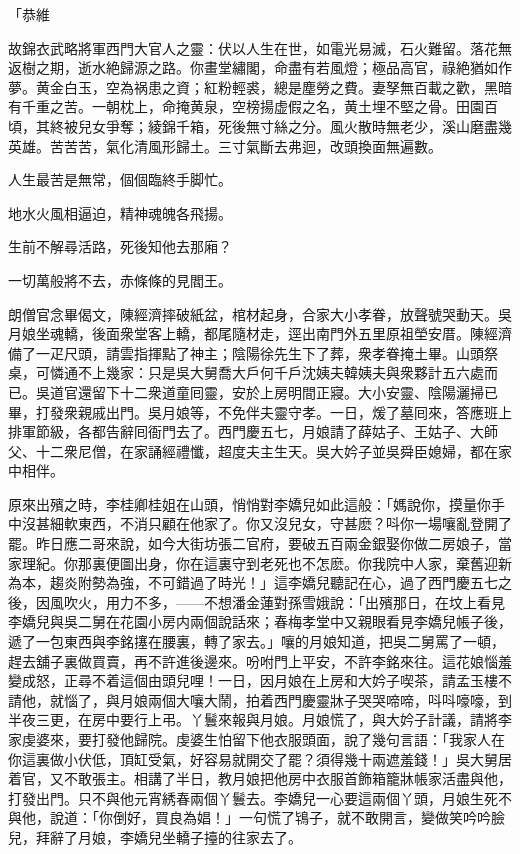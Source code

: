 \begin{myquote}
「恭維

故錦衣武略將軍西門大官人之靈：伏以人生在世，如電光易滅，石火難留。落花無返樹之期，逝水絶歸源之路。你畫堂繡閣，命盡有若風燈；極品高官，祿絶猶如作夢。黄金白玉，空為祸患之資；紅粉輕裘，總是塵勞之費。妻孥無百載之歡，黑暗有千重之苦。一朝枕上，命掩黄泉，空榜揚虚假之名，黄土埋不堅之骨。田園百頃，其終被兒女爭奪；綾錦千箱，死後無寸絲之分。風火散時無老少，溪山磨盡幾英雄。苦苦苦，氣化清風形歸土。三寸氣斷去弗迴，改頭換面無遍數。

{}

人生最苦是無常，個個臨終手脚忙。

地水火風相逼迫，精神魂魄各飛揚。

生前不解尋活路，死後知他去那廂？

一切萬般將不去，赤條條的見閻王。
\end{myquote}

朗僧官念畢偈文，陳經濟摔破紙盆，棺材起身，合家大小孝眷，放聲號哭動天。吳月娘坐魂轎，後面衆堂客上轎，都尾隨材走，逕出南門外五里原祖塋安厝。陳經濟備了一疋尺頭，請雲指揮點了神主；陰陽徐先生下了葬，衆孝眷掩土畢。山頭祭桌，可憐通不上幾家：只是吳大舅喬大戶何千戶沈姨夫韓姨夫與衆夥計五六處而已。吳道官還留下十二衆道童囘靈，安於上房明間正寢。大小安靈、陰陽灑掃已畢，打發衆親戚出門。吳月娘等，不免伴夫靈守孝。一日，煖了墓囘來，答應班上排軍節級，各都告辭囘衙門去了。西門慶五七，月娘請了薛姑子、王姑子、大師父、十二衆尼僧，在家誦經禮懺，超度夫主生天。吳大妗子並吳舜臣媳婦，都在家中相伴。

原來出殯之時，李桂卿桂姐在山頭，悄悄對李嬌兒如此這般：「媽說你，摸量你手中沒甚細軟東西，不消只顧在他家了。你又沒兒女，守甚麽？呌你一場嚷亂登開了罷。昨日應二哥來說，如今大街坊張二官府，要破五百兩金銀娶你做二房娘子，當家理紀。你那裏便圖出身，你在這裏守到老死也不怎麽。你我院中人家，棄舊迎新為本，趨炎附勢為強，不可錯過了時光！」這李嬌兒聽記在心，過了西門慶五七之後，因風吹火，用力不多，——不想潘金蓮對孫雪娥說：「出殯那日，在坟上看見李嬌兒與吳二舅在花園小房内兩個說話來；春梅孝堂中又親眼看見李嬌兒帳子後，遞了一包東西與李銘㩙在腰裏，轉了家去。」嚷的月娘知道，把吳二舅罵了一頓，趕去舖子裏做買賣，再不許進後邊來。吩咐門上平安，不許李銘來往。這花娘惱羞變成怒，正尋不着這個由頭兒哩！一日，因月娘在上房和大妗子喫茶，請孟玉樓不請他，就惱了，與月娘兩個大嚷大鬧，拍着西門慶靈牀子哭哭啼啼，呌呌嚎嚎，到半夜三更，在房中要行上弔。丫鬟來報與月娘。月娘慌了，與大妗子計議，請將李家虔婆來，要打發他歸院。虔婆生怕留下他衣服頭面，說了幾句言語：「我家人在你這裏做小伏低，頂缸受氣，好容易就開交了罷？須得幾十兩遮羞錢！」吳大舅居着官，又不敢張主。相講了半日，教月娘把他房中衣服首飾箱籠牀帳家活盡與他，打發出門。只不與他元宵綉春兩個丫鬟去。李嬌兒一心要這兩個丫頭，月娘生死不與他，說道：「你倒好，買良為娼！」一句慌了鴇子，就不敢開言，變做笑吟吟臉兒，拜辭了月娘，李嬌兒坐轎子擡的往家去了。

